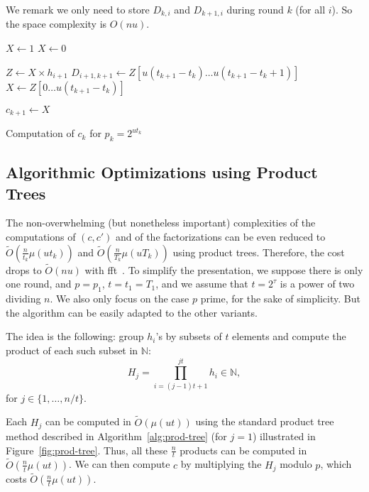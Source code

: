 \documentclass[11pt]{llncs}
\newcommand{\Oapp}{\ensuremath{\tilde{O}}}
\begin{document}
We remark we only need to store $D_{k,i}$ and $D_{k+1,i}$ during round $k$ (for all $i$).
So the space complexity is $O(nu)$.


\begin{algorithm}
\newcommand{\vstart}{\ensuremath{\mathrm{start}}}
\newcommand{\vmid}{\ensuremath{\mathrm{mid}}}
\newcommand{\vend}{\ensuremath{\mathrm{end}}}
\begin{algorithmic}[1]

  \State $X \gets 1$
\Else
  \State $X \gets 0$
\EndIf

  \State $Z \gets X \times h_{i+1}$
  \State $D_{i+1,k+1} \gets Z[u(t_{k+1}-t_k)\dots u(t_{k+1}-t_k+1)]$
  \State $X \gets Z[0\dots u(t_{k+1}-t_k)]$
\EndFor

\State $c_{k+1} \gets X$
\end{algorithmic}
\caption{Computation of $c_k$ for $p_k = 2^{ut_k}$}\label{alg:even-p-c}
\end{algorithm}

\subsection{Algorithmic Optimizations using Product Trees}
\label{sec:algo-opt-prod-trees}

The non-overwhelming (but nonetheless important) complexities of the computations of $(c,c')$ and of the factorizations can be even reduced to $\Oapp(\frac{n}{t_k} \mu(u t_k))$ and $\Oapp(\frac{n}{T_k} \mu(u T_k))$ using product trees. 
Therefore, the cost drops to $\Oapp(n u)$ with {\sc fft}~\cite{schonhage1971schnelle}. 
To simplify the presentation, we suppose there is only one round, and $p=p_1$, $t=t_1=T_1$, and we assume that $t=2^\tau$ is a power of two dividing $n$.
We also only focus on the case $p$ prime, for the sake of simplicity.
But the algorithm can be easily adapted to the other variants.

The idea is the following: group $h_i$'s by subsets of $t$ elements and compute the product of each such subset in $\mathbb{N}$:
\[ H_j = \prod_{i=(j-1) t + 1}^{j t} h_i\in\mathbb{N}, \]
for $j \in \{1,\dots,n/t\}$.

Each $H_j$ can be computed in $\Oapp(\mu(u t))$ using the standard product tree method described in Algorithm~\ref{alg:prod-tree} (for $j=1$) illustrated in Figure~\ref{fig:prod-tree}.
Thus, all these $\frac{n}{t}$ products can be computed in $\Oapp(\frac{n}{t} \mu(u t))$. We can then compute $c$ by multiplying the $H_j$ modulo $p$, which costs $\Oapp(\frac{n}{t} \mu(u t))$.
\end{document}

